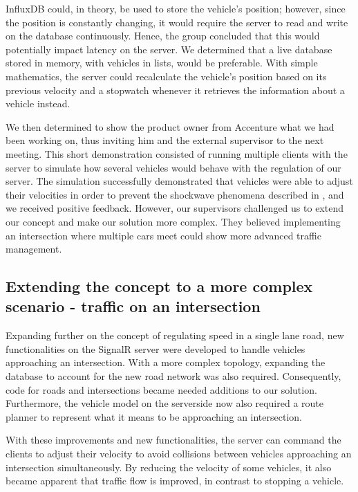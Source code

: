 InfluxDB could, in theory, be used to store the vehicle's position; however, since the position is constantly changing, it would require the server to read and write on the database continuously. Hence, the group concluded that this would potentially impact latency on the server. We determined that a live database stored in memory, with vehicles in lists, would be preferable. With simple mathematics, the server could recalculate the vehicle's position based on its previous velocity and a stopwatch whenever it retrieves the information about a vehicle instead.

We then determined to show the product owner from Accenture what we had been working on, thus inviting him and the external supervisor to the next meeting. This short demonstration consisted of running multiple clients with the server to simulate how several vehicles would behave with the regulation of our server. The simulation successfully demonstrated that vehicles were able to adjust their velocities in order to prevent the shockwave phenomena described in , and we received positive feedback. However, our supervisors challenged us to extend our concept and make our solution more complex. They believed implementing an intersection where multiple cars meet could show more advanced traffic management.

\subsection{Extending the concept to a more complex scenario - traffic on an intersection}
Expanding further on the concept of regulating speed in a single lane road, new functionalities on the SignalR server were developed to handle vehicles approaching an intersection. With a more complex topology, expanding the database to account for the new road network was also required. Consequently, code for roads and intersections became needed additions to our solution. Furthermore, the vehicle model on the serverside now also required a route planner to represent what it means to be approaching an intersection.

With these improvements and new functionalities, the server can command the clients to adjust their velocity to avoid collisions between vehicles approaching an intersection simultaneously. By reducing the velocity of some vehicles, it also became apparent that traffic flow is improved, in contrast to stopping a vehicle.